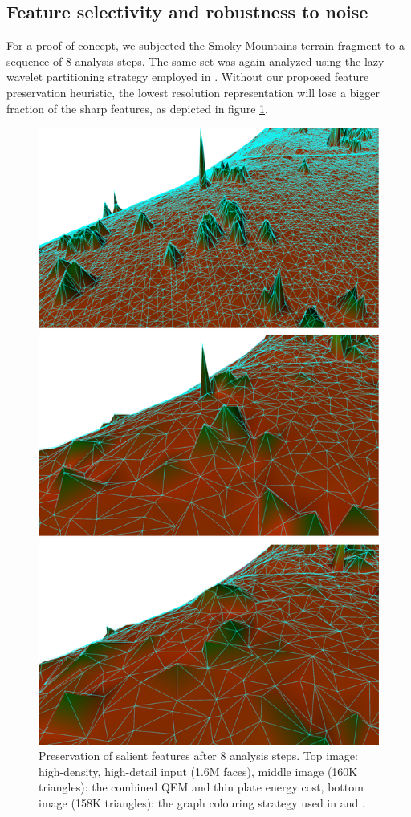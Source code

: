 \documentclass[graybox]{svmult}
\begin{document}
	\subsection{Feature selectivity and robustness to noise}
	For a proof of concept, we subjected the Smoky Mountains terrain fragment to a sequence of 8 analysis steps. The same set was again analyzed using the lazy-wavelet partitioning strategy employed in \cite{Wagner2005, Martinez2011}. Without our proposed feature preservation
	heuristic, the lowest resolution representation will lose a bigger fraction of the sharp features, as depicted in figure \ref{fig_cds:sharpFeatures}.
	
	\begin{figure}[!htbp]
		\centering
		\includegraphics[width=0.75\linewidth]{QEMvsNO.png}
		\caption{\label{fig_cds:sharpFeatures}
			Preservation of salient features after 8 analysis steps. Top image: high-density, high-detail input (1.6M faces), middle image (160K triangles): the combined QEM and thin plate energy cost, bottom image (158K triangles): the graph colouring strategy used in \cite{Wagner2005} and \cite{Martinez2011}. }
	\end{figure}
	
\end{document}
